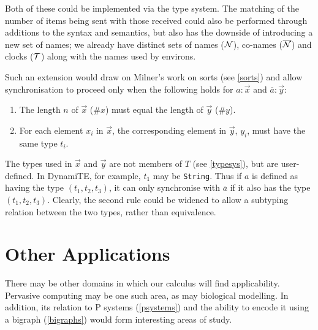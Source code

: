 Both of these could be implemented via the type system.  The matching
of the number of items being sent with those received could also be
performed through additions to the syntax and semantics, but also has
the downside of introducing a new set of names; we already have
distinct sets of names ($\text{$\mathcal{N}$}$), co-names ($\text{$\overline{\text{$\mathcal{N}$}}$}$) and clocks
($\text{$\mathcal{T}$}$) along with the names used by environs.

Such an extension would draw on Milner's work on sorts (see
\ref{sorts}) and allow synchronisation to proceed only when the
following holds for $a : \vec{x}$ and $\overline{a} : \vec{y}$:

\begin{enumerate}
\item The length $n$ of $\vec{x}$ ($\#x$) must equal the length of $\vec{y}$ ($\#y$).
\item For each element $x_i$ in $\vec{x}$, the corresponding element in $\vec{y}$, $y_i$, must have the same type $t_i$.
\end{enumerate}

The types used in $\vec{x}$ and $\vec{y}$ are not members of $T$ (see
\ref{typesys}), but are user-defined.  In DynamiTE, for example, $t_1$
may be \texttt{String}.  Thus if $a$ is defined as having the type
$(t_1, t_2, t_3)$, it can only synchronise with $\overline{a}$ if it
also has the type $(t_1, t_2, t_3)$.  Clearly, the second rule could
be widened to allow a subtyping relation between the two types, rather
than equivalence.

\section{Other Applications}
\label{future:apps}

There may be other domains in which our calculus will find
applicability.  Pervasive computing may be one such area, as may
biological modelling.  In addition, its relation to P systems
(\ref{psystems}) and the ability to encode it using a bigraph
(\ref{bigraphs}) would form interesting areas of study.
